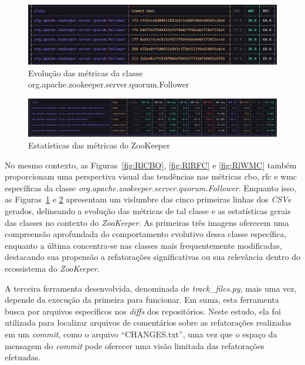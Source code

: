\begin{figure}[h]
    \centering
    \includegraphics[width=0.8\linewidth]{figuras/Output/Metrics_Evolution/Metrics_Evolution.png}
    \caption{Evolução das métricas da classe org.apache.zookeeper.server.quorum.Follower}
    \label{fig:EvolutionFollowerClass}
\end{figure}

\begin{figure}[h]
    \centering
    \includegraphics[width=0.8\linewidth]{figuras/Output/Metrics_Statistics/Metrics_Statistics.png}
    \caption{Estatísticas das métricas do ZooKeeper}
    \label{fig:StatisticsFollowerClass}
\end{figure}

No mesmo contexto, as Figuras~\ref{fig:RlCBO}, \ref{fig:RlRFC} e \ref{fig:RlWMC} também proporcionam uma perspectiva visual das tendências nas métricas \gls{cbo}, \gls{rfc} e \gls{wmc} específicas da classe \textit{org.apache.zookeeper.server.quorum.Follower}. Enquanto isso, as Figuras~\ref{fig:EvolutionFollowerClass} e \ref{fig:StatisticsFollowerClass} apresentam um vislumbre das cinco primeiras linhas dos \textit{CSVs} gerados, delineando a evolução das métricas de tal classe e as estatísticas gerais das classes no contexto do \textit{ZooKeeper}. As primeiras três imagens oferecem uma compreensão aprofundada do comportamento evolutivo dessa classe específica, enquanto a última concentra-se nas classes mais frequentemente modificadas, destacando sua propensão a refatorações significativas ou sua relevância dentro do ecossistema do \textit{ZooKeeper}.

A terceira ferramenta desenvolvida, denominada de \textit{track\_files.py}\cite{PyDriller:TrackFiles:2023}, mais uma vez, depende da execução da primeira para funcionar. Em suma, esta ferramenta busca por arquivos específicos nos \textit{diffs} dos repositórios. Neste estudo, ela foi utilizada para localizar arquivos de comentários sobre as refatorações realizadas em um \textit{commit}, como o arquivo ``CHANGES.txt'', uma vez que o espaço da mensagem do \textit{commit} pode oferecer uma visão limitada das refatorações efetuadas.

